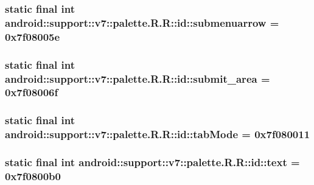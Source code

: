 \hypertarget{classandroid_1_1support_1_1v7_1_1palette_1_1_r_1_1id_a7ac8f6f1d5413891763e0f9bb9c6bbd}{
\subsubsection[{submenuarrow}]{\setlength{\rightskip}{0pt plus 5cm}static final int android::support::v7::palette.R.R::id::submenuarrow = 0x7f08005e}}
\label{classandroid_1_1support_1_1v7_1_1palette_1_1_r_1_1id_a7ac8f6f1d5413891763e0f9bb9c6bbd}


\hypertarget{classandroid_1_1support_1_1v7_1_1palette_1_1_r_1_1id_08c15e86d29410bd0285a8dc005e0e4a}{
\subsubsection[{submit\_\-area}]{\setlength{\rightskip}{0pt plus 5cm}static final int android::support::v7::palette.R.R::id::submit\_\-area = 0x7f08006f}}
\label{classandroid_1_1support_1_1v7_1_1palette_1_1_r_1_1id_08c15e86d29410bd0285a8dc005e0e4a}


\hypertarget{classandroid_1_1support_1_1v7_1_1palette_1_1_r_1_1id_a653f887f033b382f72b424242aff9f8}{
\subsubsection[{tabMode}]{\setlength{\rightskip}{0pt plus 5cm}static final int android::support::v7::palette.R.R::id::tabMode = 0x7f080011}}
\label{classandroid_1_1support_1_1v7_1_1palette_1_1_r_1_1id_a653f887f033b382f72b424242aff9f8}


\hypertarget{classandroid_1_1support_1_1v7_1_1palette_1_1_r_1_1id_e3ec98d7d18be105105c4ada957aaf97}{
\subsubsection[{text}]{\setlength{\rightskip}{0pt plus 5cm}static final int android::support::v7::palette.R.R::id::text = 0x7f0800b0}}
\label{classandroid_1_1support_1_1v7_1_1palette_1_1_r_1_1id_e3ec98d7d18be105105c4ada957aaf97}


